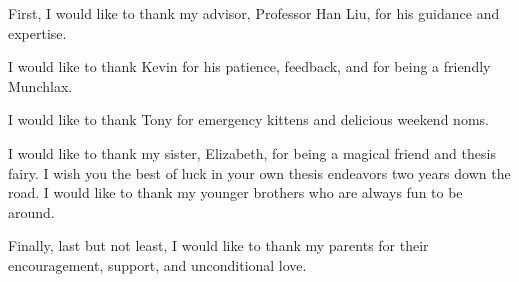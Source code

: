 
First, I would like to thank my advisor, Professor Han Liu, for his 
guidance and expertise.

I would like to thank Kevin for his patience, feedback, and for being a 
friendly Munchlax. 

I would like to thank Tony for emergency kittens and delicious weekend noms.

I would like to thank my sister, Elizabeth, for being a magical friend 
and thesis fairy. I wish you the best of luck in your own thesis endeavors two 
years down the road. 
I would like to thank my younger brothers who are always fun to be around.

Finally, last but not least, I would like to thank my parents for their 
encouragement, support, and unconditional love. 